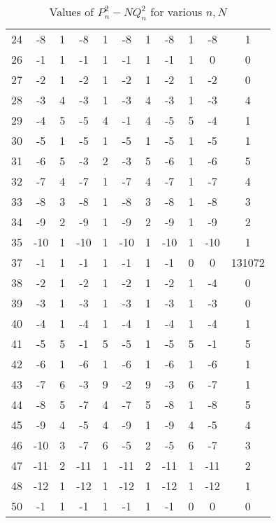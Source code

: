 \documentclass{article}
\begin{document}
\begin{table}[hp]
\begin{center}
\begin{tabular}{|c|cccccccccc|}
24                 & -8  & 1 & -8  & 1 & -8  & 1 & -8  & 1 & -8  & 1      \\
26                 & -1  & 1 & -1  & 1 & -1  & 1 & -1  & 1 & 0   & 0      \\
27                 & -2  & 1 & -2  & 1 & -2  & 1 & -2  & 1 & -2  & 0      \\
28                 & -3  & 4 & -3  & 1 & -3  & 4 & -3  & 1 & -3  & 4      \\
29                 & -4  & 5 & -5  & 4 & -1  & 4 & -5  & 5 & -4  & 1      \\
30                 & -5  & 1 & -5  & 1 & -5  & 1 & -5  & 1 & -5  & 1      \\
31                 & -6  & 5 & -3  & 2 & -3  & 5 & -6  & 1 & -6  & 5      \\
32                 & -7  & 4 & -7  & 1 & -7  & 4 & -7  & 1 & -7  & 4      \\
33                 & -8  & 3 & -8  & 1 & -8  & 3 & -8  & 1 & -8  & 3      \\
34                 & -9  & 2 & -9  & 1 & -9  & 2 & -9  & 1 & -9  & 2      \\
35                 & -10 & 1 & -10 & 1 & -10 & 1 & -10 & 1 & -10 & 1      \\
37                 & -1  & 1 & -1  & 1 & -1  & 1 & -1  & 0 & 0   & 131072 \\
38                 & -2  & 1 & -2  & 1 & -2  & 1 & -2  & 1 & -4  & 0      \\
39                 & -3  & 1 & -3  & 1 & -3  & 1 & -3  & 1 & -3  & 0      \\
40                 & -4  & 1 & -4  & 1 & -4  & 1 & -4  & 1 & -4  & 1      \\
41                 & -5  & 5 & -1  & 5 & -5  & 1 & -5  & 5 & -1  & 5      \\
42                 & -6  & 1 & -6  & 1 & -6  & 1 & -6  & 1 & -6  & 1      \\
43                 & -7  & 6 & -3  & 9 & -2  & 9 & -3  & 6 & -7  & 1      \\
44                 & -8  & 5 & -7  & 4 & -7  & 5 & -8  & 1 & -8  & 5      \\
45                 & -9  & 4 & -5  & 4 & -9  & 1 & -9  & 4 & -5  & 4      \\
46                 & -10 & 3 & -7  & 6 & -5  & 2 & -5  & 6 & -7  & 3      \\
47                 & -11 & 2 & -11 & 1 & -11 & 2 & -11 & 1 & -11 & 2      \\
48                 & -12 & 1 & -12 & 1 & -12 & 1 & -12 & 1 & -12 & 1      \\
50                 & -1  & 1 & -1  & 1 & -1  & 1 & -1  & 0 & 0   & 0      \\ \hline
\end{tabular}
\caption{Values of $P_n^2-NQ_n^2$ for various $n,N$}
\end{center}
\end{table}	
\end{document}
